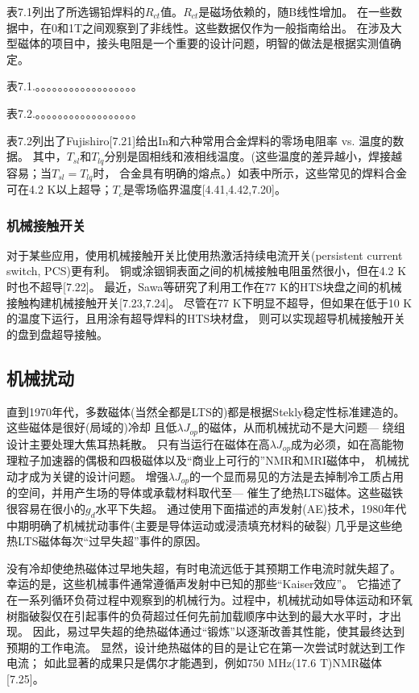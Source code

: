 表7.1列出了所选锡铅焊料的$R_{ct}$值。$R_{ct}$是磁场依赖的，随B线性增加。
在一些数据中，在0和1T之间观察到了非线性。这些数据仅作为一般指南给出。
在涉及大型磁体的项目中，接头电阻是一个重要的设计问题，明智的做法是根据实测值确定。


表7.1.。。。。。。。。。。。。。。。。。。

表7.2.。。。。。。。。。。。。。。。。。。

表7.2列出了Fujishiro[7.21]给出In和六种常用合金焊料的零场电阻率 vs. 温度的数据。
其中，$T_{sl}$和$T_{lq}$分别是固相线和液相线温度。(这些温度的差异越小，焊接越容易；当$T_{sl} = T_{lq}$时，
合金具有明确的熔点。）如表中所示，这些常见的焊料合金可在4.2 K以上超导；$T_c$是零场临界温度[4.41,4.42,7.20]。

\subsubsection*{机械接触开关}
对于某些应用，使用机械接触开关比使用热激活持续电流开关(persistent current switch, PCS)更有利。
铜或涂铟铜表面之间的机械接触电阻虽然很小，但在4.2 K时也不超导[7.22]。
最近，Sawa等研究了利用工作在77 K的HTS块盘之间的机械接触构建机械接触开关[7.23,7.24]。
尽管在77 K下明显不超导，但如果在低于10 K的温度下运行，且用涂有超导焊料的HTS块材盘，
则可以实现超导机械接触开关的盘到盘超导接触。

\subsection{机械扰动}
直到1970年代，多数磁体(当然全都是LTS的)都是根据Stekly稳定性标准建造的。这些磁体是很好(局域的)冷却
且低$\lambda J_{op}$的磁体，从而机械扰动不是大问题---
绕组设计主要处理大焦耳热耗散。
只有当运行在磁体在高$\lambda J_{op}$成为必须，如在高能物理粒子加速器的偶极和四极磁体以及“商业上可行的”NMR和MRI磁体中，
机械扰动才成为关键的设计问题。
增强$\lambda J_{op}$的一个显而易见的方法是去掉制冷工质占用的空间，并用产生场的导体或承载材料取代至---
催生了绝热LTS磁体。这些磁铁很容易在很小的$g_d$水平下失超。
通过使用下面描述的声发射(AE)技术，1980年代中期明确了机械扰动事件(主要是导体运动或浸渍填充材料的破裂)
几乎是这些绝热LTS磁体每次“过早失超”事件的原因。


没有冷却使绝热磁体过早地失超，有时电流远低于其预期工作电流时就失超了。
幸运的是，这些机械事件通常遵循声发射中已知的那些“Kaiser效应”。
它描述了在一系列循环负荷过程中观察到的机械行为。过程中，机械扰动如导体运动和环氧树脂破裂仅在引起事件的负荷超过任何先前加载顺序中达到的最大水平时，才出现。
因此，易过早失超的绝热磁体通过“锻炼”以逐渐改善其性能，使其最终达到预期的工作电流。
显然，设计绝热磁体的目的是让它在第一次尝试时就达到工作电流；
如此显著的成果只是偶尔才能遇到，例如750 MHz(17.6 T)NMR磁体[7.25]。

